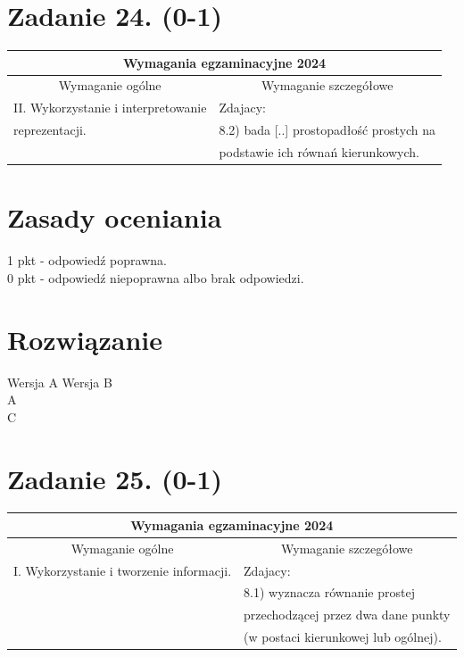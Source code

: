 \documentclass[10pt]{article}
\begin{document}
\section*{Zadanie 24. (0-1)}
\begin{center}
\begin{tabular}{|l|l|}
\hline
\multicolumn{2}{|c|}{Wymagania egzaminacyjne 2024} \\
\hline
\multicolumn{1}{|c|}{Wymaganie ogólne} & \multicolumn{1}{c|}{Wymaganie szczegółowe} \\
\hline
\multicolumn{1}{|c|}{II. Wykorzystanie i interpretowanie} & Zdajacy: \\
reprezentacji. & 8.2) bada [..] prostopadłość prostych na \\
 & podstawie ich równań kierunkowych. \\
\hline
\end{tabular}
\end{center}

\section*{Zasady oceniania}
1 pkt - odpowiedź poprawna.\\
0 pkt - odpowiedź niepoprawna albo brak odpowiedzi.

\section*{Rozwiązanie}
Wersja A Wersja B\\
A\\
C

\section*{Zadanie 25. (0-1)}
\begin{center}
\begin{tabular}{|l|l|}
\hline
\multicolumn{2}{|c|}{Wymagania egzaminacyjne 2024} \\
\hline
\multicolumn{1}{|c|}{Wymaganie ogólne} & \multicolumn{1}{c|}{Wymaganie szczegółowe} \\
\hline
I. Wykorzystanie i tworzenie informacji. & Zdajacy: \\
 & 8.1) wyznacza równanie prostej \\
 & przechodzącej przez dwa dane punkty \\
 & (w postaci kierunkowej lub ogólnej). \\
\hline
\end{tabular}
\end{center}
\end{document}

